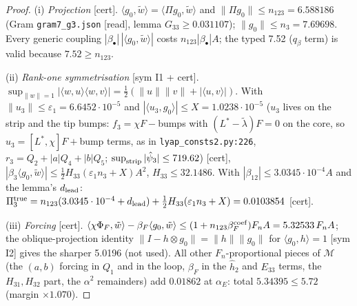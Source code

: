 \documentclass[10pt]{article}
\newcommand{\wt}{\tilde w}
\newcommand{\ip}[2]{\langle #1,#2\rangle}
\begin{document}
\begin{proof}
(i) \emph{Projection} [cert]. $\ip{g_0}{\wt}=\ip{\Pi g_0}{\wt}$ and $\|\Pi g_0\|\le n_{123}=6.588186$ (Gram \texttt{gram7\_g3.json} [read], lemma $G_{33}\ge0.031107$);
$\|g_0\|\le n_3=7.69698$. Every generic coupling $|\beta_\bullet|\,|\ip{g_0}{\wt}|$ costs $n_{123}|\beta_\bullet|A$; the typed 7.52 ($q_\beta$ term) is valid because $7.52\ge n_{123}$.

(ii) \emph{Rank-one symmetrisation} [sym I1 + cert]. $\sup_{\|w\|=1}|\ip{w}{u}\ip{w}{v}|=\tfrac12(\|u\|\|v\|+|\ip uv|)$. With $\|u_3\|\le\varepsilon_1=6.6452\cdot10^{-5}$
and $|\ip{u_3}{g_0}|\le X=1.0238\cdot10^{-5}$ ($u_3$ lives on the strip and the tip bumps: $f_3=\chi F-{}$bumps with $(L^*-\tilde\lambda)F=0$ on the core, so $u_3=[L^*,\chi]F+{}$bump terms, as in \texttt{lyap\_consts2.py:226}, $r_3=Q_2+|a|Q_4+|b|Q_5$; $\sup_{\rm strip}|\hat\psi_3|\le719.62$) [cert],
$|\beta_3\ip{g_0}{\wt}|\le\tfrac12H_{33}(\varepsilon_1n_3+X)A^2$, $H_{33}\le32.1486$. With $|\beta_{12}|\le3.0345\cdot10^{-4}A$ and the lemma's $d_{\rm lead}$:
$\Pi_3^{\rm true}=n_{123}(3.0345\cdot10^{-4}+d_{\rm lead})+\tfrac12H_{33}(\varepsilon_1n_3+X)=0.0103854$ [cert].

(iii) \emph{Forcing} [cert]. $\ip{\chi\Phi_F}{\wt}-\beta_F\ip{g_0}{\wt}\le(1+n_{123}\beta_F^{\rm coef})F_nA=5.32533\,F_nA$; the oblique-projection identity
$\|I-h\otimes g_0\|=\|h\|\|g_0\|$ for $\ip{g_0}{h}=1$ [sym I2] gives the sharper 5.0196 (not used). All other $F_n$-proportional pieces of $\mathcal M$
(the $(a,b)$ forcing in $Q_1$ and in the loop, $\beta_F$ in the $\hat h_2$ and $E_{33}$ terms, the $H_{31},H_{32}$ part, the $\alpha^2$ remainders) add $0.01862$ at $\alpha_E$:
total $5.34395\le5.72$ (margin $\times1.070$).


\end{proof}
\end{document}
